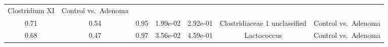 \documentclass[12pt,]{article}
\begin{document}
\begin{longtable}[]{@{}ccccccc@{}}
\begin{minipage}[t]{0.23\columnwidth}
Clostridium XI\strut
\end{minipage} & \begin{minipage}[t]{0.16\columnwidth}\centering\strut
Control vs.~Adenoma\strut
\end{minipage}\tabularnewline
\begin{minipage}[t]{0.06\columnwidth}\centering\strut
0.71\strut
\end{minipage} & \begin{minipage}[t]{0.10\columnwidth}\centering\strut
0.54\strut
\end{minipage} & \begin{minipage}[t]{0.10\columnwidth}\centering\strut
0.95\strut
\end{minipage} & \begin{minipage}[t]{0.08\columnwidth}\centering\strut
1.99e-02\strut
\end{minipage} & \begin{minipage}[t]{0.08\columnwidth}\centering\strut
2.92e-01\strut
\end{minipage} & \begin{minipage}[t]{0.23\columnwidth}\centering\strut
Clostridiaceae 1 unclassified\strut
\end{minipage} & \begin{minipage}[t]{0.16\columnwidth}\centering\strut
Control vs.~Adenoma\strut
\end{minipage}\tabularnewline
\begin{minipage}[t]{0.06\columnwidth}\centering\strut
0.68\strut
\end{minipage} & \begin{minipage}[t]{0.10\columnwidth}\centering\strut
0.47\strut
\end{minipage} & \begin{minipage}[t]{0.10\columnwidth}\centering\strut
0.97\strut
\end{minipage} & \begin{minipage}[t]{0.08\columnwidth}\centering\strut
3.56e-02\strut
\end{minipage} & \begin{minipage}[t]{0.08\columnwidth}\centering\strut
4.59e-01\strut
\end{minipage} & \begin{minipage}[t]{0.23\columnwidth}\centering\strut
Lactococcus\strut
\end{minipage} & \begin{minipage}[t]{0.16\columnwidth}\centering\strut
Control vs.~Adenoma\strut
\end{minipage}\tabularnewline

\end{longtable}
\end{document}
